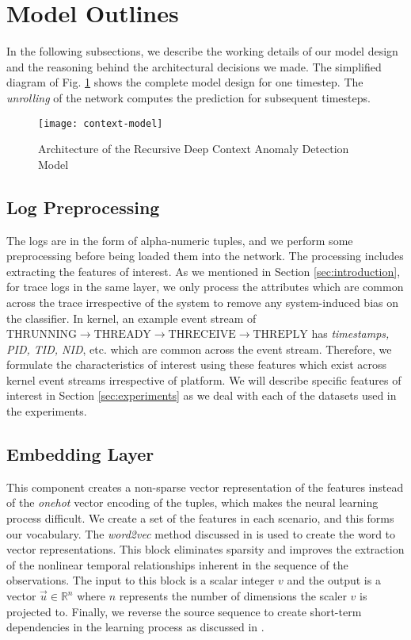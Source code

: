 \section{Model Outlines}
\label{sec:design}
In the following subsections, we describe the working details of our model 
design and the reasoning behind the architectural decisions we made. The 
simplified diagram of Fig. \ref{fig:model-architecture} shows the complete 
model design for one timestep. The \emph{unrolling} of the network computes the 
prediction for subsequent timesteps.

\begin{figure}[!t]
	\centering
	\texttt{[image: context-model]} 
	\caption{Architecture of the Recursive Deep Context Anomaly Detection Model 
	}
	\label{fig:model-architecture}
\end{figure} 

\subsection{Log Preprocessing}
\label{subsec:preprocessing}
The logs are in the form of alpha-numeric tuples, and we perform some 
preprocessing before being loaded them into the network. The processing 
includes extracting the features of interest. As we mentioned in Section 
\ref{sec:introduction}, for trace logs in the same layer, we only process the 
attributes which are common across the trace irrespective of the system to 
remove any system-induced bias on the classifier. In kernel, an example event 
stream of $\text{THRUNNING} \longrightarrow \text{THREADY} \longrightarrow 
\text{THRECEIVE} \longrightarrow \text{THREPLY}$ has \emph{timestamps, PID, 
TID, NID}, etc. which are common across the event stream. Therefore, we 
formulate the characteristics of interest using these features which exist 
across kernel event streams irrespective of platform. We will describe specific 
features of interest in Section \ref{sec:experiments} as we deal with each of 
the datasets used in the experiments.

\subsection{Embedding Layer}
\label{subsec:embedding-layer}
This component creates a non-sparse vector representation of the features 
instead of the \emph{onehot} vector encoding of the tuples, which makes the 
neural learning process difficult. We create a set of the features in each 
scenario, and this forms our vocabulary. The \emph{word2vec} method discussed 
in \cite{mikolov2013efficient} is used to create the word to vector 
representations. This block eliminates sparsity and improves the extraction of 
the nonlinear temporal relationships inherent in the sequence of the 
observations. The input to this block is a scalar integer $ v $ and the output 
is a vector $ \vec{u} \in \mathbb{R}^n $ where $ n $ represents the number of 
dimensions the scaler $ v $ is projected to. Finally, we reverse the source 
sequence to create short-term dependencies in the learning process as 
discussed in \cite{sutskever2014sequence}.

